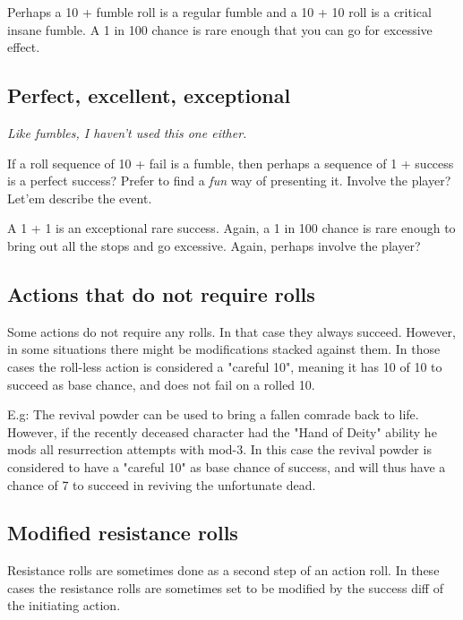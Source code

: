 Perhaps a 10 + fumble roll is a regular fumble and a 10 + 10 roll is a critical insane fumble. A 1 in 100 chance is rare enough that you can go for excessive effect.


\subsection*{Perfect, excellent, exceptional}
\emph{Like fumbles, I haven't used this one either.}

If a roll sequence of 10 + fail is a fumble, then perhaps a sequence of 1 + success is a perfect success? Prefer to find a \emph{fun} way of presenting it. Involve the player? Let'em describe the event.

A 1 + 1 is an exceptional rare success. Again, a 1 in 100 chance is rare enough to bring out all the stops and go excessive. Again, perhaps involve the player?


\subsection*{Actions that do not require rolls}
Some actions do not require any rolls. In that case they always succeed. However, in some situations there might be modifications stacked against them. In those cases the roll-less action is considered a "careful 10", meaning it has 10 of 10 to succeed as base chance, and does not fail on a rolled 10.

E.g: The revival powder can be used to bring a fallen comrade back to life. However, if the recently deceased character had the "Hand of Deity" ability he mods all resurrection attempts with mod-3. In this case the revival powder is considered to have a "careful 10" as base chance of success, and will thus have a chance of 7 to succeed in reviving the unfortunate dead.


\subsection*{Modified resistance rolls}
Resistance rolls are sometimes done as a second step of an action roll. In these cases the resistance rolls are sometimes set to be modified by the success diff of the initiating action.

